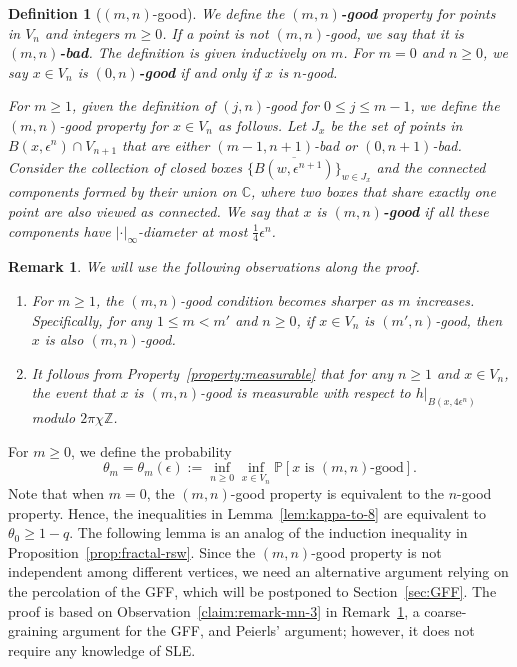\documentclass[a4paper]{article}
\numberwithin{equation}{section}
\newtheorem{remark}[theorem]{Remark}
\newtheorem{definition}[theorem]{Definition}
\numberwithin{equation}{section}
\renewcommand{\1}{\mathbf{1}}
\begin{document}
\begin{definition}[$(m,n)$-good]\label{def:(m,n)-good}
    We define the \textbf{$(m,n)$-good} property for points in $V_n$ and integers $m \geq 0$. If a point is not $(m,n)$-good, we say that it is \textbf{$(m,n)$-bad}.
    The definition is given inductively on $m$. For $m = 0$ and $n \geq 0$, we say $x \in V_n$ is \textbf{$(0,n)$-good} if and only if $x$ is $n$-good.

    For $m \geq 1$, given the definition of $(j,n)$-good for $0 \leq j \leq m-1$, we define the $(m,n)$-good property for $x \in V_n$ as follows. Let $J_x$ be the set of points in $B(x,\epsilon^n) \cap V_{n+1}$ that are either $(m-1,n+1)$-bad or $(0, n+1)$-bad. Consider the collection of closed boxes $\{ \overline{B(w, \epsilon^{n+1})} \}_{w \in J_x}$ and the connected components formed by their union on $\mathbb{C}$, where two boxes that share exactly one point are also viewed as connected. We say that $x$ is \textbf{$(m,n)$-good} if all these components have $|\cdot|_\infty$-diameter at most $\frac{1}{4} \epsilon^n$.
\end{definition}

\begin{remark}\label{rmk:(m,n)-good}
    We will use the following observations along the proof.
    \begin{enumerate}[(1)]
        \item \label{claim:remark-mn-1} For $m \ge 1$, the $(m,n)$-good condition becomes sharper as $m$ increases. Specifically, for any $1 \le m<m'$ and $n \geq 0$, if $x \in V_n$ is $(m',n)$-good, then $x$ is also $(m,n)$-good.
        
        \item \label{claim:remark-mn-3} It follows from Property~\eqref{property:measurable} that for any $n \geq 1$ and $x \in V_n$, the event that $x$ is $(m,n)$-good is measurable with respect to $h|_{B(x, 4 \epsilon^n)}$ modulo $2 \pi \chi \mathbb{Z}$.
    \end{enumerate}
\end{remark}

For $m \geq 0$, we define the probability
\begin{equation}\label{eq:def-thetam}
    \theta_m = \theta_m(\epsilon) := \inf_{n \geq 0} \inf_{x \in V_n} \mathbb{P}[x \mbox{ is } (m,n)\mbox{-good}].
\end{equation}
Note that when $m=0$, the $(m,n)$-good property is equivalent to the $n$-good property. Hence, the inequalities in Lemma~\ref{lem:kappa-to-8} are equivalent to $\theta_0 \geq 1-q$. The following lemma is an analog of the induction inequality in Proposition~\ref{prop:fractal-rsw}. Since the $(m,n)$-good property is not independent among different vertices, we need an alternative argument relying on the percolation of the GFF, which will be postponed to Section~\ref{sec:GFF}. The proof is based on Observation~\eqref{claim:remark-mn-3} in Remark~\ref{rmk:(m,n)-good}, a coarse-graining argument for the GFF, and Peierls' argument; however, it does not require any knowledge of SLE.
\end{document}
